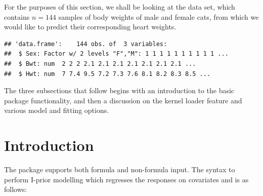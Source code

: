 %



For the purposes of this section, we shall be looking at the  data set, which contains $n = 144$ samples of body weights of male and female cats, from which we would like to predict their corresponding heart weights.

\begin{knitrout}
\color{fgcolor}\begin{kframe}
\begin{alltt}
  \hlstd{=} \hlstd{);} 
\end{alltt}
\begin{verbatim}
## 'data.frame':	144 obs. of  3 variables:
##  $ Sex: Factor w/ 2 levels "F","M": 1 1 1 1 1 1 1 1 1 1 ...
##  $ Bwt: num  2 2 2 2.1 2.1 2.1 2.1 2.1 2.1 2.1 ...
##  $ Hwt: num  7 7.4 9.5 7.2 7.3 7.6 8.1 8.2 8.3 8.5 ...
\end{verbatim}
\end{kframe}
\end{knitrout}

The three subsections that follow begins with an introduction to the basic  package functionality, and then a discussion on the kernel loader feature and various model and fitting options.

\section{Introduction}\label{sec:ipriorpkgintro}

The  package supports both formula and non-formula input. The syntax to perform I-prior modelling which regresses the responses  on covariates  and  is as follows:

\begin{knitrout}
\color{fgcolor}\begin{kframe}
\begin{alltt}
 \hlkwb{<-}  \hlopt{~}  \hlopt{+}     
 \hlkwb{<-} \hlstd{(} \hlopt{$}\hlopt{$}\hlopt{$}  
\end{alltt}
\end{kframe}
\end{knitrout}


